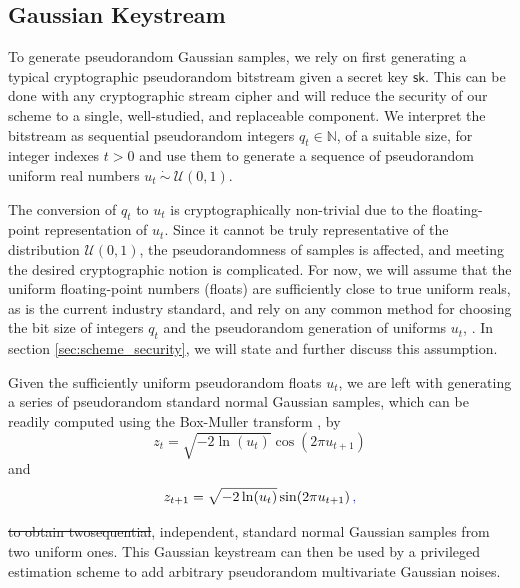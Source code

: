 \documentclass[letterpaper, 10 pt, conference]{ieeeconf}
\providecommand{\DIFadd}[1]{{\protect\color{blue}\uwave{#1}}} %
\providecommand{\DIFdel}[1]{{\protect\color{red}\sout{#1}}}                      %
\providecommand{\DIFaddbegin}{} %
\providecommand{\DIFaddend}{} %
\providecommand{\DIFdelbegin}{} %
\providecommand{\DIFdelend}{} %
\newcommand{\DIFscaledelfig}{0.5}
\newlength{\DIFdelgraphicswidth} %
\newlength{\DIFdelgraphicsheight} %
\newcommand{\DIFaddincludegraphics}[2][]{{\color{blue}\fbox{\DIFOincludegraphics[#1]{#2}}}} %
\newcommand{\DIFdelincludegraphics}[2][]{%
\sbox{\DIFdelgraphicsbox}{\DIFOincludegraphics[#1]{#2}}%
\settoboxwidth{\DIFdelgraphicswidth}{\DIFdelgraphicsbox} %
\settoboxtotalheight{\DIFdelgraphicsheight}{\DIFdelgraphicsbox} %
\scalebox{\DIFscaledelfig}{%
\parbox[b]{\DIFdelgraphicswidth}{\usebox{\DIFdelgraphicsbox}\\[-\baselineskip] \rule{\DIFdelgraphicswidth}{0em}}\llap{\resizebox{\DIFdelgraphicswidth}{\DIFdelgraphicsheight}{%
\setlength{\unitlength}{\DIFdelgraphicswidth}%
\begin{picture}(1,1)%
\thicklines\linethickness{2pt} %
{\color[rgb]{1,0,0}\put(0,0){\framebox(1,1){}}}%
{\color[rgb]{1,0,0}\put(0,0){\line( 1,1){1}}}%
{\color[rgb]{1,0,0}\put(0,1){\line(1,-1){1}}}%
\end{picture}%
}\hspace*{3pt}}} %
} %
\DeclareRobustCommand{\DIFaddbegin}{\DIFOaddbegin \let\includegraphics\DIFaddincludegraphics} %
\DeclareRobustCommand{\DIFaddend}{\DIFOaddend \let\includegraphics\DIFOincludegraphics} %
\DeclareRobustCommand{\DIFdelbegin}{\DIFOdelbegin \let\includegraphics\DIFdelincludegraphics} %
\DeclareRobustCommand{\DIFdelend}{\DIFOaddend \let\includegraphics\DIFOincludegraphics} %
\begin{document}
\subsection{Gaussian Keystream}\label{subsec:gaussian_keystream}
To generate pseudorandom Gaussian samples, we \DIFaddbegin \DIFadd{choose to }\DIFaddend rely on first generating a typical cryptographic pseudorandom bitstream given a secret key $\mathsf{sk}$. This can be done with any cryptographic stream cipher and will reduce the security of our scheme to a single, well-studied, and replaceable component. We interpret the bitstream as sequential pseudorandom integers $q_t \in \mathbb{N}$, of a suitable size, for integer indexes $t>0$ and use them to generate a sequence of pseudorandom uniform real numbers $u_t\ \dot{\sim}\ \mathcal{U}(0,1)$.

The conversion of $q_t$ to $u_t$ is cryptographically non-trivial due to the floating-point representation of $u_t$. Since it cannot be truly representative of the distribution $\mathcal{U}(0,1)$, the pseudorandomness of samples is affected, and meeting the desired cryptographic notion is complicated. For now, we will assume that the uniform floating-point numbers (floats) are sufficiently close to true uniform reals, as is the current industry standard, and rely on any common method for choosing the bit size of integers $q_t$ and the pseudorandom generation of uniforms $u_t$, \cite{goualardGeneratingRandomFloatingPoint2020}. In section \ref{sec:scheme_security}, we will state and further discuss this assumption.

Given the sufficiently uniform pseudorandom floats $u_t$, we are left with generating a series of pseudorandom standard normal Gaussian samples, which can be readily computed using the Box-Muller transform \cite{paleyFourierTransformsComplex1934}, by
\begin{equation}
   z_t = \sqrt{-2\ln (u_t)}\cos(2\pi u_{t+1})
\end{equation}
and
\begin{equation}
   z_{t+1} = \sqrt{-2\ln (u_t)}\sin(2\pi u_{t+1})\DIFaddbegin \DIFadd{\,,
}\DIFaddend \end{equation}
\DIFdelbegin \DIFdel{to obtain twosequential}\DIFdelend \DIFaddbegin \DIFadd{obtaining two}\DIFaddend , independent, standard normal Gaussian samples from two uniform ones. This Gaussian keystream can then be used by a privileged estimation scheme to add arbitrary pseudorandom multivariate Gaussian noises.

% 
% 
\end{document}
